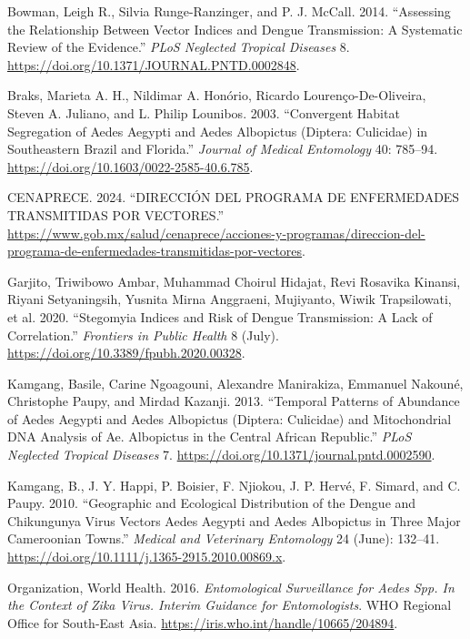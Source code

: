 \documentclass[
  letterpaper,
  twocolumn,
  landscape]{report}
\newlength{\cslhangindent}
\newenvironment{CSLReferences}[2] %
 {\begin{list}{}{%
  \setlength{\itemindent}{0pt}
  \setlength{\leftmargin}{0pt}
  \setlength{\parsep}{0pt}
  \ifodd #1
   \setlength{\leftmargin}{\cslhangindent}
   \setlength{\itemindent}{-1\cslhangindent}
  \fi
  \setlength{\itemsep}{#2\baselineskip}}}
 {\end{list}}
\begin{document}
\label{refs}
\begin{CSLReferences}{1}{0}
Bowman, Leigh R., Silvia Runge-Ranzinger, and P. J. McCall. 2014.
{``Assessing the Relationship Between Vector Indices and Dengue
Transmission: A Systematic Review of the Evidence.''} \emph{PLoS
Neglected Tropical Diseases} 8.
\url{https://doi.org/10.1371/JOURNAL.PNTD.0002848}.

Braks, Marieta A. H., Nildimar A. Honório, Ricardo Lourenço-De-Oliveira,
Steven A. Juliano, and L. Philip Lounibos. 2003. {``Convergent Habitat
Segregation of Aedes Aegypti and Aedes Albopictus (Diptera: Culicidae)
in Southeastern Brazil and Florida.''} \emph{Journal of Medical
Entomology} 40: 785--94.
\url{https://doi.org/10.1603/0022-2585-40.6.785}.

CENAPRECE. 2024. {``DIRECCIÓN DEL PROGRAMA DE ENFERMEDADES TRANSMITIDAS
POR VECTORES.''}
\url{https://www.gob.mx/salud/cenaprece/acciones-y-programas/direccion-del-programa-de-enfermedades-transmitidas-por-vectores}.

Garjito, Triwibowo Ambar, Muhammad Choirul Hidajat, Revi Rosavika
Kinansi, Riyani Setyaningsih, Yusnita Mirna Anggraeni, Mujiyanto, Wiwik
Trapsilowati, et al. 2020. {``Stegomyia Indices and Risk of Dengue
Transmission: A Lack of Correlation.''} \emph{Frontiers in Public
Health} 8 (July). \url{https://doi.org/10.3389/fpubh.2020.00328}.

Kamgang, Basile, Carine Ngoagouni, Alexandre Manirakiza, Emmanuel
Nakouné, Christophe Paupy, and Mirdad Kazanji. 2013. {``Temporal
Patterns of Abundance of Aedes Aegypti and Aedes Albopictus (Diptera:
Culicidae) and Mitochondrial DNA Analysis of Ae. Albopictus in the
Central African Republic.''} \emph{PLoS Neglected Tropical Diseases} 7.
\url{https://doi.org/10.1371/journal.pntd.0002590}.

Kamgang, B., J. Y. Happi, P. Boisier, F. Njiokou, J. P. Hervé, F.
Simard, and C. Paupy. 2010. {``Geographic and Ecological Distribution of
the Dengue and Chikungunya Virus Vectors Aedes Aegypti and Aedes
Albopictus in Three Major Cameroonian Towns.''} \emph{Medical and
Veterinary Entomology} 24 (June): 132--41.
\url{https://doi.org/10.1111/j.1365-2915.2010.00869.x}.

Organization, World Health. 2016. \emph{Entomological Surveillance for
Aedes Spp. In the Context of Zika Virus. Interim Guidance for
Entomologists}. WHO Regional Office for South-East Asia.
\url{https://iris.who.int/handle/10665/204894}.


\end{CSLReferences}
\end{document}

